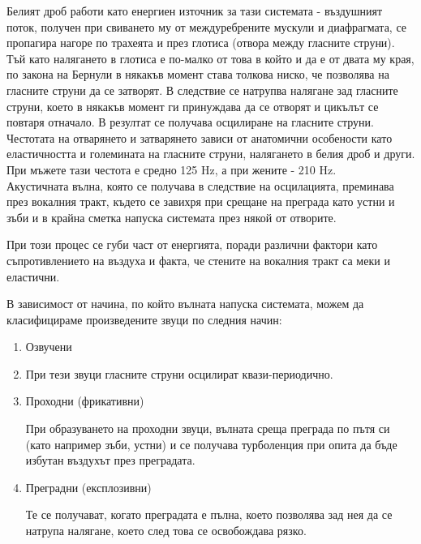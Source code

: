 \documentclass[12pt]{report}
\numberwithin{equation}{section}
\numberwithin{figure}{section}
\begin{document}
    Белият дроб работи като енергиен източник за тази системата - въздушният поток, получен при свиването му от междуребрените мускули и диафрагмата,
    се пропагира нагоре по трахеята и през глотиса (отвора между гласните струни).\\
    Тъй като налягането в глотиса е по-малко от това в който и да е от двата му края, по закона на Бернули
    в някакъв момент става толкова ниско, че позволява на гласните струни да се затворят. В следствие се натрупва налягане зад гласните струни, което в някакъв момент ги принуждава
    да се отворят и цикълът се повтаря отначало. В резултат се получава осцилиране на гласните струни. Честотата на отварянето и затварянето зависи от анатомични особености като еластичността и големината на
    гласните струни, налягането в белия дроб и други.\\
    При мъжете тази честота е средно 125 Hz, а при жените - 210 Hz.\\
    Акустичната вълна, която се получава в следствие на осцилацията,
    преминава през вокалния тракт, където се завихря при срещане на преграда като устни и зъби и в крайна сметка напуска системата през някой от отворите.

    При този процес се губи част от енергията, поради различни фактори като съпротивлението на въздуха и факта, че стените на вокалния тракт са меки и еластични.

    В зависимост от начина, по който вълната напуска системата, можем да класифицираме произведените звуци по следния начин:

    \begin{enumerate}
        \item Озвучени
        \item 
        При тези звуци гласните струни осцилират квази-периодично.
        
        \item Проходни (фрикативни) 
        
        При образуването на проходни звуци, вълната среща преграда по пътя си
        (като например зъби, устни) и се получава турболенция при опита да бъде избутан въздухът през преградата.
        
        \item Преградни (експлозивни)
        
        Те се получават, когато преградата е пълна, което позволява зад нея да се натрупа налягане, което след това се освобождава рязко.
    \end{enumerate}
    
\end{document}
